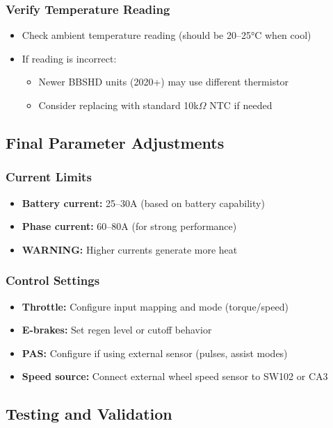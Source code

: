\documentclass[11pt,a4paper]{article}
\newcommand{\warning}[1]{\textcolor{warningcolor}{\textbf{WARNING:} #1}}
\begin{document}
\subsubsection{Verify Temperature Reading}
\begin{itemize}
    \item Check ambient temperature reading (should be 20--25°C when cool)
    \item If reading is incorrect:
    \begin{itemize}
        \item Newer BBSHD units (2020+) may use different thermistor
        \item Consider replacing with standard 10k$\Omega$ NTC if needed
    \end{itemize}
\end{itemize}

\subsection{Final Parameter Adjustments}

\subsubsection{Current Limits}
\begin{itemize}
    \item \textbf{Battery current:} 25--30A (based on battery capability)
    \item \textbf{Phase current:} 60--80A (for strong performance)
    \item \warning{Higher currents generate more heat}
\end{itemize}

\subsubsection{Control Settings}
\begin{itemize}
    \item \textbf{Throttle:} Configure input mapping and mode (torque/speed)
    \item \textbf{E-brakes:} Set regen level or cutoff behavior
    \item \textbf{PAS:} Configure if using external sensor (pulses, assist modes)
    \item \textbf{Speed source:} Connect external wheel speed sensor to SW102 or CA3
\end{itemize}

\subsection{Testing and Validation}
\end{document}
